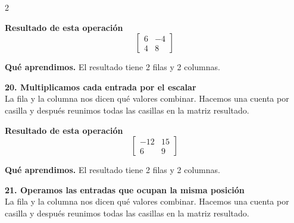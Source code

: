 \documentclass[11pt,a4paper,landscape]{article}
\begin{document}
\begin{multicols*}{2}
\begin{minipage}{\linewidth}
\par\smallskip \textbf{Resultado de esta operación}\[\begin{bmatrix}6 & -4\\4 & 8\end{bmatrix}\]
\par\smallskip\textbf{Qué aprendimos.} El resultado tiene 2 filas y 2 columnas.
\end{minipage}\par\medskip
\noindent\begin{minipage}{\linewidth}\textbf{20. Multiplicamos cada entrada por el escalar}\\[2pt]La fila y la columna nos dicen qué valores combinar. Hacemos una cuenta por casilla y después reunimos todas las casillas en la matriz resultado.
\par{}\par\smallskip
\par\smallskip \textbf{Resultado de esta operación}\[\begin{bmatrix}-12 & 15\\6 & 9\end{bmatrix}\]
\par\smallskip\textbf{Qué aprendimos.} El resultado tiene 2 filas y 2 columnas.
\end{minipage}\par\medskip
\noindent\begin{minipage}{\linewidth}\textbf{21. Operamos las entradas que ocupan la misma posición}\\[2pt]La fila y la columna nos dicen qué valores combinar. Hacemos una cuenta por casilla y después reunimos todas las casillas en la matriz resultado.
\par{}\par\smallskip

\end{minipage}
\end{multicols*}
\end{document}
